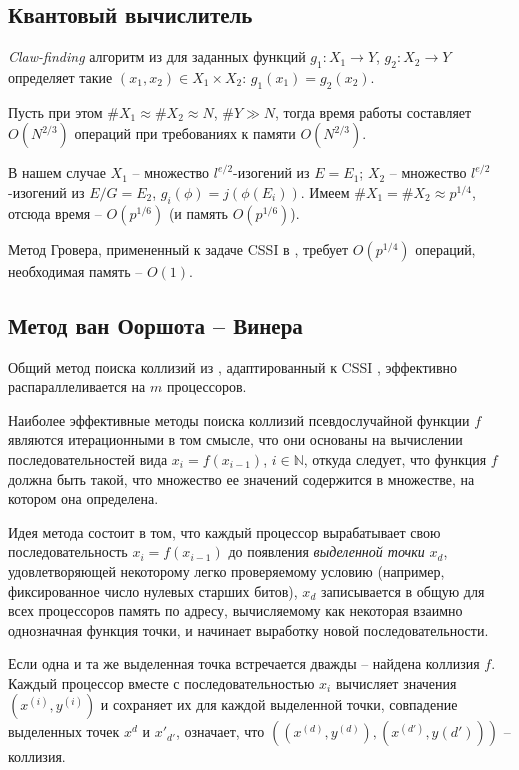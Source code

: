\documentclass[a4paper,12pt]{article}
\newcommand{\NN}{\mathbb{N}}
\theoremstyle{definition}
\begin{document}

 \subsection*{Квантовый вычислитель}

\emph{Claw-finding} алгоритм из \cite{quant} для заданных функций $g_1:X_1\to Y$, $g_2:X_2\to Y$ определяет такие $(x_1, x_2)\in X_1\times X_2$: $g_1(x_1)=g_2(x_2)$.

Пусть при этом $\#X_1\approx \#X_2 \approx N$, $\#Y\gg N$, тогда время работы составляет $O(N^{2/3})$ операций при требованиях к памяти $O(N^{2/3})$.

В нашем случае $X_1 $ -- множество $l^{e/2}$-изогений  из $E=E_1$; $X_2$ -- множество $l^{e/2}$-изогений  из $E/G=E_2$, $g_i(\phi)=j(\phi(E_i))$.
Имеем $\#X_1=\#X_2\approx p^{1/4}$, отсюда  время -- $O(p^{1/6})$ (и память $O(p^{1/6})$).

Метод Гровера, примененный к задаче CSSI в \cite{FFF}, требует $O(p^{1/4})$ операций,  необходимая память -- $O(1)$.


 \subsection*{Метод ван Ооршота -- Винера}
 
Общий метод поиска коллизий из \cite{vOW}, адаптированный к CSSI \cite{Adj,Costello}, эффективно распараллеливается на $m$ процессоров.

Наиболее эффективные методы поиска коллизий псевдослучайной функции $f$ являются итерационными в том смысле, что они основаны на вычислении 
последовательностей вида $x_i = f(x_{i-1})$, $i \in \NN$, откуда следует, что функция $f$ должна быть такой, что множество ее значений содержится в множестве, 
на котором она определена.
 
Идея метода состоит в том, что
каждый процессор вырабатывает свою последовательность $x_i=f(x_{i-1})$ до появления \emph{выделенной точки} $x_d$, удовлетворяющей некоторому легко проверяемому условию (например, фиксированное число нулевых старших битов), $x_d$ записывается в общую для всех процессоров память по адресу, вычисляемому как некоторая взаимно однозначная функция точки, и начинает выработку новой последовательности.


Если одна и та же выделенная точка встречается дважды -- найдена коллизия $f$. Каждый процессор вместе с последовательностью $x_i$ вычисляет значения $(x^{(i)},y^{(i)})$ и сохраняет их для каждой выделенной точки, совпадение выделенных точек $x^d$ и $x'_{d'}$, означает, что $((x^{(d)}, y^{(d)}), (x^{(d')}, y{(d')}))$ -- коллизия.
\end{document}
